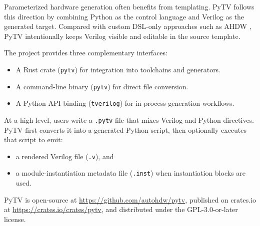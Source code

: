 Parameterized hardware generation often benefits from templating.
PyTV follows this direction by combining Python as the control language and Verilog as the generated target.
Compared with custom DSL-only approaches such as AHDW \cite{zhao2023automatic},
PyTV intentionally keeps Verilog visible and editable in the source template.

The project provides three complementary interfaces:
\begin{itemize}
  \item A Rust crate (\texttt{pytv}) for integration into toolchains and generators.
  \item A command-line binary (\texttt{pytv}) for direct file conversion.
  \item A Python API binding (\texttt{tverilog}) for in-process generation workflows.
\end{itemize}

At a high level, users write a \texttt{.pytv} file that mixes Verilog and Python directives.
PyTV first converts it into a generated Python script, then optionally executes that script to emit:
\begin{itemize}
  \item a rendered Verilog file (\texttt{.v}), and
  \item a module-instantiation metadata file (\texttt{.inst}) when instantiation blocks are used.
\end{itemize}

PyTV is open-source at \url{https://github.com/autohdw/pytv},
published on crates.io at \url{https://crates.io/crates/pytv},
and distributed under the GPL-3.0-or-later license.

